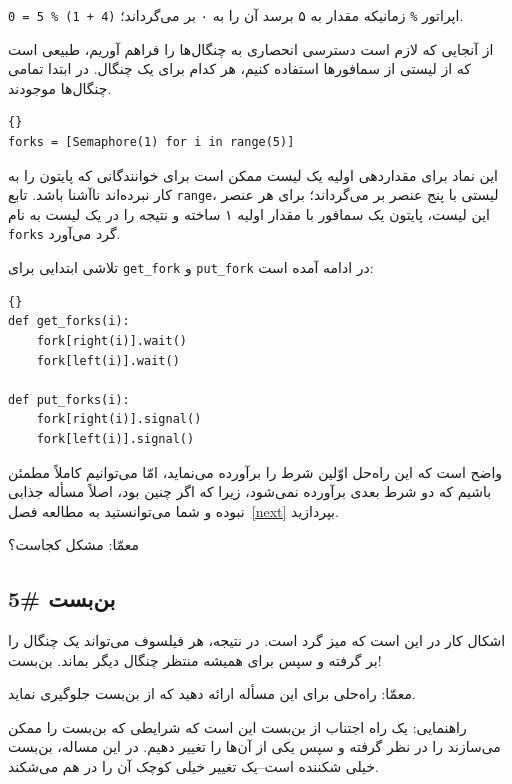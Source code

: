 \documentclass{book}
\newcommand{\clearemptydoublepage}{}%
\begin{document}
    اپراتور {\tt \%} زمانیکه مقدار به ۵ برسد آن را به ۰ بر می‌گرداند؛ {\tt (4 + 1) \% 5 = 0}.

    از آنجایی که لازم است دسترسی انحصاری به چنگال‌ها را فراهم آوریم، طبیعی است که از لیستی از سمافورها استفاده کنیم، هر کدام برای یک چنگال. 
    در ابتدا تمامی چنگال‌ها موجودند. 

\begin{latin}
\begin{lstlisting}[title=\rl{متغیرهای غذا خوردن فیلسوف‌ها}]{}
forks = [Semaphore(1) for i in range(5)]
\end{lstlisting}
\end{latin}

    این نماد برای مقداردهی اولیه یک لیست ممکن است برای خوانندگانی که  پایتون را به کار نبرده‌اند ناآشنا باشد. 
    تابع {\tt range}، لیستی با پنج عنصر بر‌ می‌گرداند؛ برای هر عنصر این لیست، پایتون یک سمافور با مقدار اولیه ۱ ساخته 
    و نتیجه را در یک لیست به نام  {\tt forks} گرد می‌آورد.  

    تلاشی ابتدایی برای  {\tt get\_fork} و {\tt put\_fork} در ادامه آمده است:

\begin{latin}
\begin{lstlisting}[title=\rl{ناراه‌حل غذا خوردن فیلسوف‌ها}]{}
def get_forks(i):
    fork[right(i)].wait()
    fork[left(i)].wait()

def put_forks(i):
    fork[right(i)].signal()
    fork[left(i)].signal()
\end{lstlisting}
\end{latin}

    واضح است که این راه‌حل اوّلین شرط را برآورده می‌نماید، امّا می‌توانیم کاملاً مطمئن باشیم که دو شرط  بعدی برآورده نمی‌شود، زیرا که 
    اگر چنین بود، اصلاً مسأله جذابی نبوده و شما می‌توانستید به مطالعه فصل~\ref{next} بپردازید. 

    معمّا:‌ مشکل کجاست؟


\clearemptydoublepage
\subsection{بن‌بست \#5}

    اشکال کار در این است که میز گرد است. در نتیجه، هر فیلسوف می‌تواند یک چنگال را بر گرفته 
    و سپس برای همیشه منتظر چنگال دیگر بماند. بن‌بست! 

    معمّا: راه‌حلی برای این مسأله ارائه دهید که از بن‌بست جلوگیری نماید. 

    راهنمایی: یک راه اجتناب از بن‌بست این است که شرایطی که بن‌بست را ممکن می‌سازند را در نظر گرفته  و سپس یکی از آن‌ها را تغییر دهیم. 
    در این مساله، بن‌بست خیلی شکننده است--یک تغییر خیلی کوچک آن را در هم می‌شکند. 
\end{document}
